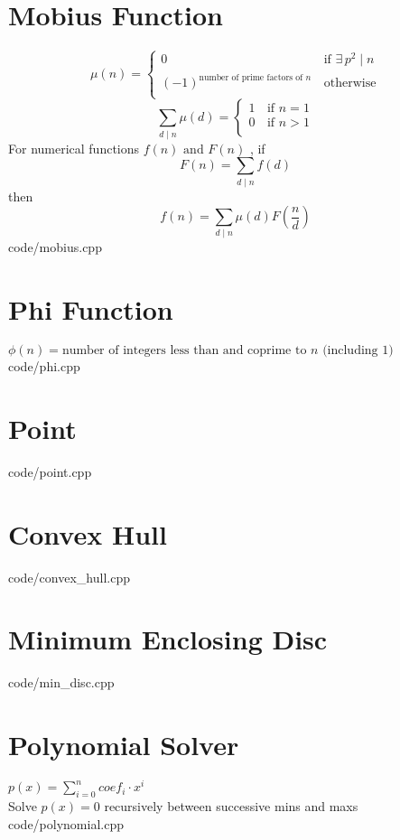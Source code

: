 \documentclass [landscape,8pt,a4paper,twocolumn]{article}
\begin{document}
\section{Mobius Function}
\[\mu (n) =
 	\begin{cases}
		0	& \, \text{if } \exists \, p^2 \mid n \\
		(-1)^{\text{number of prime factors of } n}	& \, \text{otherwise} \\
	\end{cases}
\]
\[\sum_{d \mid n} \mu(d) =
	\begin{cases}
    	1	& \, \text{if } n=1 \\
        0	& \, \text{if } n>1 \\
	\end{cases}
\]
For numerical functions $ f(n) \text{ and } F(n) $ , if
\[
	F(n)=\sum_{d \mid n}f(d)
\]
then
\[
	f(n)=\sum_{d \mid n}\mu(d)F(\frac{n}{d})
\]
 {code/mobius.cpp}

\section{Phi Function}
$ \phi(n)= \text{number of integers less than and coprime to } n \text{ (including } 1) $
 {code/phi.cpp}

\section{Point}
 {code/point.cpp}

\section{Convex Hull}
 {code/convex_hull.cpp}

\section{Minimum Enclosing Disc}
 {code/min_disc.cpp}

\section{Polynomial Solver}
$ p(x)=\sum_{i=0}^{n} coef_i \cdot x^i $ \\
Solve $ p(x)=0 $ recursively between successive mins and maxs
 {code/polynomial.cpp}
\end{document}
